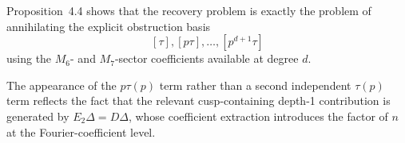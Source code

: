 Proposition~4.4 shows that the recovery problem is exactly the problem of annihilating the explicit obstruction basis
\[
[\tau],[p\tau],\dots,[p^{d+1}\tau]
\]
using the $M_6$- and $M_7$-sector coefficients available at degree $d$.

The appearance of the $p\tau(p)$ term rather than a second independent $\tau(p)$ term reflects the fact that the relevant cusp-containing depth-1 contribution is generated by $E_2\Delta=D\Delta$, whose coefficient extraction introduces the factor of $n$ at the Fourier-coefficient level.
